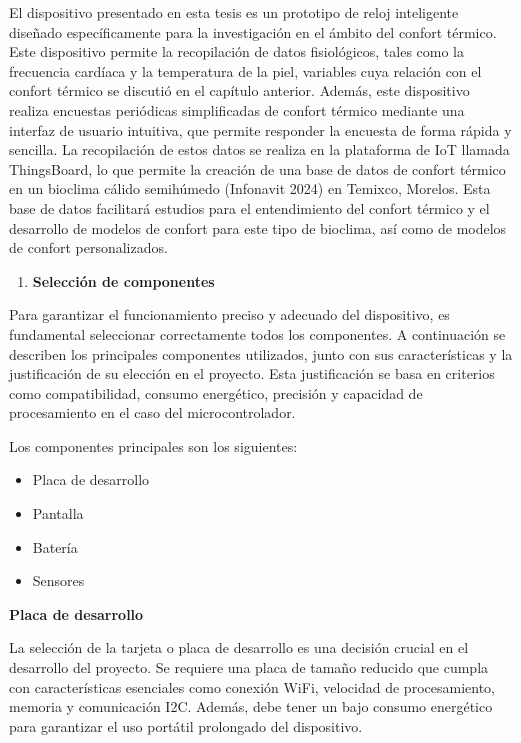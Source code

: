 \documentclass[
  letterpaper,
  DIV=11,
  numbers=noendperiod]{scrreport}
\providecommand{\tightlist}{%
  \setlength{\itemsep}{0pt}\setlength{\parskip}{0pt}}\usepackage{longtable,booktabs,array}
\begin{document}
El dispositivo presentado en esta tesis es un prototipo de reloj
inteligente diseñado específicamente para la investigación en el ámbito
del confort térmico. Este dispositivo permite la recopilación de datos
fisiológicos, tales como la frecuencia cardíaca y la temperatura de la
piel, variables cuya relación con el confort térmico se discutió en el
capítulo anterior. Además, este dispositivo realiza encuestas periódicas
simplificadas de confort térmico mediante una interfaz de usuario
intuitiva, que permite responder la encuesta de forma rápida y sencilla.
La recopilación de estos datos se realiza en la plataforma de IoT
llamada ThingsBoard, lo que permite la creación de una base de datos de
confort térmico en un bioclima cálido semihúmedo (Infonavit 2024) en
Temixco, Morelos. Esta base de datos facilitará estudios para el
entendimiento del confort térmico y el desarrollo de modelos de confort
para este tipo de bioclima, así como de modelos de confort
personalizados.

\begin{enumerate}
\def\labelenumi{\arabic{enumi}.}
\setcounter{enumi}{1}
\tightlist
\item
  \textbf{Selección de componentes}
\end{enumerate}

Para garantizar el funcionamiento preciso y adecuado del dispositivo, es
fundamental seleccionar correctamente todos los componentes. A
continuación se describen los principales componentes utilizados, junto
con sus características y la justificación de su elección en el
proyecto. Esta justificación se basa en criterios como compatibilidad,
consumo energético, precisión y capacidad de procesamiento en el caso
del microcontrolador.

Los componentes principales son los siguientes:

\begin{itemize}
\tightlist
\item
  Placa de desarrollo
\item
  Pantalla
\item
  Batería
\item
  Sensores
\end{itemize}

\textbf{Placa de desarrollo}

La selección de la tarjeta o placa de desarrollo es una decisión crucial
en el desarrollo del proyecto. Se requiere una placa de tamaño reducido
que cumpla con características esenciales como conexión WiFi, velocidad
de procesamiento, memoria y comunicación I2C. Además, debe tener un bajo
consumo energético para garantizar el uso portátil prolongado del
dispositivo.
\end{document}
